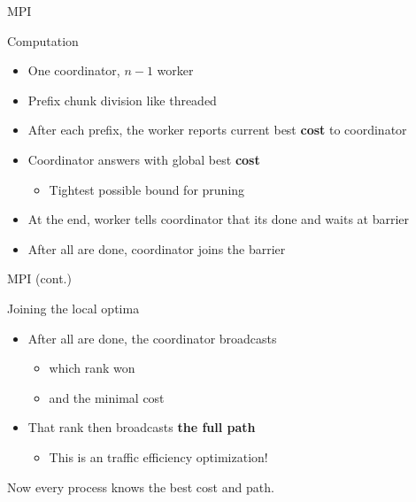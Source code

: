 \begin{frame}{MPI}
  \begin{block}{Computation}
  \begin{itemize}
    \item One coordinator, $n-1$ worker
      \pause
    \item Prefix chunk division like threaded
      \pause
    \item After each prefix, the worker reports current best \textbf{cost} to coordinator
      \pause
    \item Coordinator answers with global best \textbf{cost}
      \begin{itemize}
        \item Tightest possible bound for pruning
      \end{itemize}
      \pause
    \item At the end, worker tells coordinator that its done and waits at barrier
      \pause
    \item After all are done, coordinator joins the barrier
  \end{itemize}
  \end{block}
\end{frame}

\begin{frame}{MPI (cont.)}
  \begin{block}{Joining the local optima}
  \begin{itemize}
      \pause
    \item After all are done, the coordinator broadcasts
      \begin{itemize}
        \item which rank won
        \item and the minimal cost
      \end{itemize}
      \pause
    \item That rank then broadcasts \textbf{the full path}
      \begin{itemize}
        \item This is an traffic efficiency optimization!
      \end{itemize}
  \end{itemize}
  \pause
  Now every process knows the best cost and path.
  \end{block}
\end{frame}

